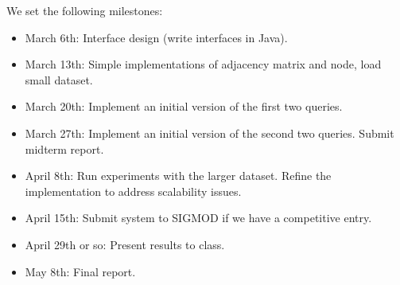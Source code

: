 \documentclass{article}
\begin{document}
\newpage

We set the following milestones:

\begin{itemize}
\item March 6th: Interface design (write interfaces in Java).
\item March 13th: Simple implementations of adjacency matrix and node, load small dataset.
\item March 20th: Implement an initial version of the first two queries.
\item March 27th: Implement an initial version of the second two queries. Submit midterm report.
\item April 8th: Run experiments with the larger dataset. Refine the implementation to address scalability issues.
\item April 15th: Submit system to SIGMOD if we have a competitive entry.
\item April 29th or so: Present results to class.
\item May 8th: Final report.
\end{itemize}



\end{document}
